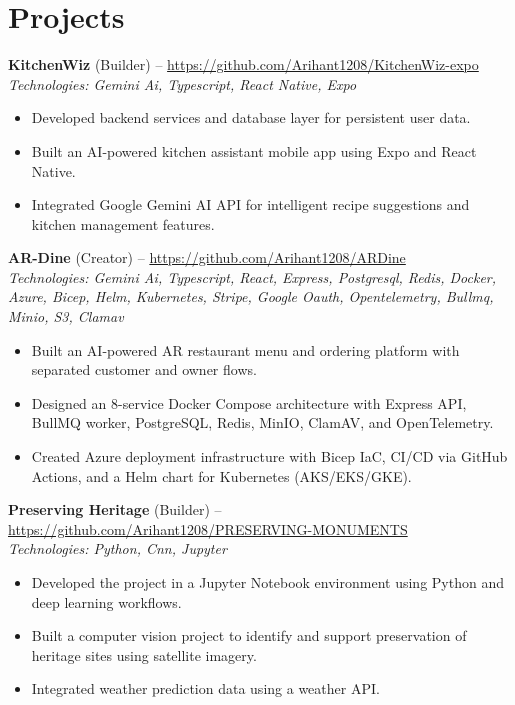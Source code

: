\documentclass[11pt,a4paper]{article}
\begin{document}
\section{Projects}
\textbf{KitchenWiz} (Builder) -- \href{https://github.com/Arihant1208/KitchenWiz-expo}{https://github.com/Arihant1208/KitchenWiz-expo}
\\ \textit{Technologies: Gemini Ai, Typescript, React Native, Expo}
\begin{itemize}
  \item Developed backend services and database layer for persistent user data.
  \item Built an AI-powered kitchen assistant mobile app using Expo and React Native.
  \item Integrated Google Gemini AI API for intelligent recipe suggestions and kitchen management features.
\end{itemize}
\vspace{2pt}
\textbf{AR-Dine} (Creator) -- \href{https://github.com/Arihant1208/ARDine}{https://github.com/Arihant1208/ARDine}
\\ \textit{Technologies: Gemini Ai, Typescript, React, Express, Postgresql, Redis, Docker, Azure, Bicep, Helm, Kubernetes, Stripe, Google Oauth, Opentelemetry, Bullmq, Minio, S3, Clamav}
\begin{itemize}
  \item Built an AI-powered AR restaurant menu and ordering platform with separated customer and owner flows.
  \item Designed an 8-service Docker Compose architecture with Express API, BullMQ worker, PostgreSQL, Redis, MinIO, ClamAV, and OpenTelemetry.
  \item Created Azure deployment infrastructure with Bicep IaC, CI/CD via GitHub Actions, and a Helm chart for Kubernetes (AKS/EKS/GKE).
\end{itemize}
\vspace{2pt}
\textbf{Preserving Heritage} (Builder) -- \href{https://github.com/Arihant1208/PRESERVING-MONUMENTS}{https://github.com/Arihant1208/PRESERVING-MONUMENTS}
\\ \textit{Technologies: Python, Cnn, Jupyter}
\begin{itemize}
  \item Developed the project in a Jupyter Notebook environment using Python and deep learning workflows.
  \item Built a computer vision project to identify and support preservation of heritage sites using satellite imagery.
  \item Integrated weather prediction data using a weather API.
\end{itemize}
\vspace{2pt}
\end{document}

